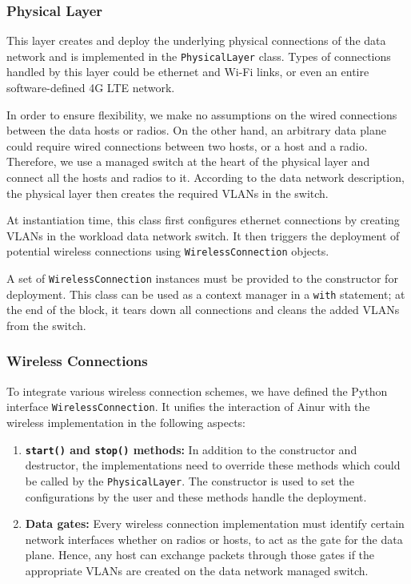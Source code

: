 \subsubsection{Physical Layer}

This layer creates and deploy the underlying physical connections of the data network and is implemented in the \texttt{PhysicalLayer} class. 
Types of connections handled by this layer could be ethernet and Wi-Fi links, or even an entire software-defined 4G \gls{LTE} network.

In order to ensure flexibility, we make no assumptions on the wired connections between the data hosts or radios.
On the other hand, an arbitrary data plane could require wired connections between two hosts, or a host and a radio.
Therefore, we use a managed switch at the heart of the physical layer and connect all the hosts and radios to it.
According to the data network description, the physical layer then creates the required \glspl{VLAN} in the switch.

At instantiation time, this class first configures ethernet connections by creating \glspl{VLAN} in the workload data network switch.
It then triggers the deployment of potential wireless connections using \texttt{WirelessConnection} objects.

A set of \texttt{WirelessConnection} instances must be provided to the constructor for deployment.
This class can be used as a context manager in a \texttt{with} statement; at the end of the block, it tears down all connections and cleans the added \glspl{VLAN} from the switch.

\subsubsection{Wireless Connections}
To integrate various wireless connection schemes, we have defined the Python interface \texttt{WirelessConnection}.
It unifies the interaction of Ainur with the wireless implementation in the following aspects: 
\begin{enumerate}
    \item \textbf{\texttt{start()} and \texttt{stop()} methods:} In addition to the constructor and destructor, the implementations need to override these methods which could be called by the \texttt{PhysicalLayer}.
    The constructor is used to set the configurations by the user and these methods handle the deployment.

    \item \textbf{Data gates:} Every wireless connection implementation must identify certain network interfaces whether on radios or hosts, to act as the gate for the data plane.
    Hence, any host can exchange packets through those gates if the appropriate VLANs are created on the data network managed switch.
\end{enumerate}

